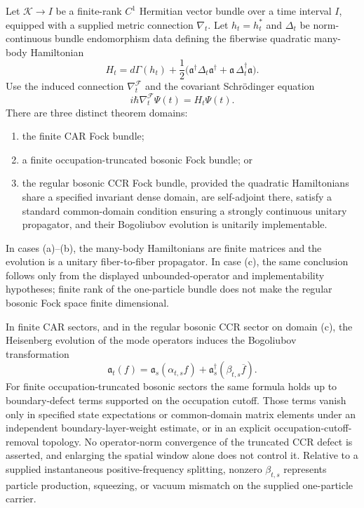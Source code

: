 \documentclass[12pt,a4paper]{article}
\begin{document}
\begin{theorem}
\label{p4:thm:curved-background-finite-bridge}
Let \(\mathcal K\to I\) be a finite-rank \(C^1\) Hermitian vector bundle over
a time interval \(I\), equipped with a supplied metric connection
\(\nabla_t\).  Let \(h_t=h_t^*\) and \(\Delta_t\) be norm-continuous bundle
endomorphism data defining the fiberwise quadratic many-body Hamiltonian
\[
H_t=d\Gamma(h_t)+\frac12\bigl(\mathfrak a^\dagger \Delta_t \mathfrak a^\dagger + \mathfrak a\,\Delta_t^\dagger \mathfrak a\bigr).
\]
Use the induced connection \(\nabla_t^{\mathcal F}\) and the covariant
Schr\"odinger equation
\[
i\hbar\nabla_t^{\mathcal F}\Psi(t)=H_t\Psi(t).
\]
There are three distinct theorem domains:
\begin{enumerate}[label=(\alph*), leftmargin=2em]
\item the finite CAR Fock bundle;
\item a finite occupation-truncated bosonic Fock bundle; or
\item the regular bosonic CCR Fock bundle, provided the quadratic
Hamiltonians share a specified invariant dense domain, are self-adjoint
there, satisfy a standard common-domain condition ensuring a strongly
continuous unitary propagator, and their Bogoliubov evolution is unitarily
implementable.
\end{enumerate}
In cases (a)--(b), the many-body Hamiltonians are finite matrices and the
evolution is a unitary fiber-to-fiber propagator.  In case (c), the same
conclusion follows only from the displayed unbounded-operator and
implementability hypotheses; finite rank of the one-particle bundle does not
make the regular bosonic Fock space finite dimensional.

In finite CAR sectors, and in the regular bosonic CCR sector on domain (c),
the Heisenberg evolution of the mode operators induces the
Bogoliubov transformation
\[
\mathfrak a_t(f)=\mathfrak a_s(\alpha_{t,s}f)+\mathfrak a_s^\dagger(\beta_{t,s}\overline f).
\]
For finite occupation-truncated bosonic sectors the same formula holds up to
boundary-defect terms supported on the occupation cutoff.  Those terms
vanish only in specified state expectations or common-domain matrix
elements under an independent boundary-layer-weight estimate, or in an
explicit occupation-cutoff-removal topology.  No operator-norm convergence
of the truncated CCR defect is asserted, and enlarging the spatial window
alone does not control it.  Relative to a supplied instantaneous positive-frequency
splitting, nonzero \(\beta_{t,s}\) represents particle production,
squeezing, or vacuum mismatch on the supplied one-particle carrier.


\end{theorem}
\end{document}
